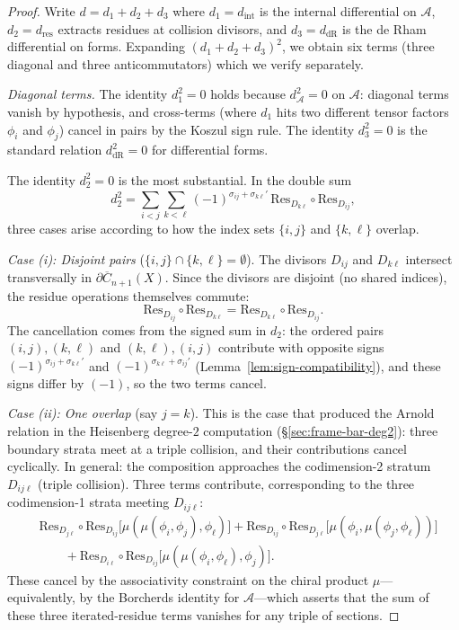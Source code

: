 \begin{proof}
Write $d = d_1 + d_2 + d_3$ where $d_1 = d_{\text{int}}$ is the internal differential on $\mathcal{A}$, $d_2 = d_{\text{res}}$ extracts residues at collision divisors, and $d_3 = d_{\text{dR}}$ is the de Rham differential on forms. Expanding $(d_1 + d_2 + d_3)^2$, we obtain six terms (three diagonal and three anticommutators) which we verify separately.

\emph{Diagonal terms.} The identity $d_1^2 = 0$ holds because $d_\mathcal{A}^2 = 0$ on $\mathcal{A}$: diagonal terms vanish by hypothesis, and cross-terms (where $d_1$ hits two different tensor factors $\phi_i$ and $\phi_j$) cancel in pairs by the Koszul sign rule. The identity $d_3^2 = 0$ is the standard relation $d_{\text{dR}}^2 = 0$ for differential forms.

The identity $d_2^2 = 0$ is the most substantial. In the double sum
\[d_2^2 = \sum_{i<j}\sum_{k<\ell} (-1)^{\sigma_{ij} + \sigma_{k\ell}'}\, \text{Res}_{D_{k\ell}} \circ \text{Res}_{D_{ij}},\]
three cases arise according to how the index sets $\{i,j\}$ and $\{k,\ell\}$ overlap.

\emph{Case (i): Disjoint pairs} ($\{i,j\} \cap \{k,\ell\} = \emptyset$). The divisors $D_{ij}$ and $D_{k\ell}$ intersect transversally in $\partial\overline{C}_{n+1}(X)$. Since the divisors are disjoint (no shared indices), the residue operations themselves commute:
\[\text{Res}_{D_{ij}} \circ \text{Res}_{D_{k\ell}} = \text{Res}_{D_{k\ell}} \circ \text{Res}_{D_{ij}}.\]
The cancellation comes from the signed sum in $d_2$: the ordered pairs $(i,j),(k,\ell)$ and $(k,\ell),(i,j)$ contribute with opposite signs $(-1)^{\sigma_{ij}+\sigma_{k\ell}'}$ and $(-1)^{\sigma_{k\ell}+\sigma_{ij}'}$ (Lemma~\ref{lem:sign-compatibility}), and these signs differ by $(-1)$, so the two terms cancel.

\emph{Case (ii): One overlap} (say $j = k$).  This is the case that produced the Arnold relation in the Heisenberg degree-$2$ computation (\S\ref{sec:frame-bar-deg2}): three boundary strata meet at a triple collision, and their contributions cancel cyclically.  In general: the composition approaches the codimension-2 stratum $D_{ij\ell}$ (triple collision). Three terms contribute, corresponding to the three codimension-1 strata meeting $D_{ij\ell}$:
\begin{align*}
&\text{Res}_{D_{j\ell}} \circ \text{Res}_{D_{ij}}\bigl[\mu(\mu(\phi_i, \phi_j), \phi_\ell)\bigr] + \text{Res}_{D_{ij}} \circ \text{Res}_{D_{j\ell}}\bigl[\mu(\phi_i, \mu(\phi_j, \phi_\ell))\bigr] \\
&\qquad + \text{Res}_{D_{i\ell}} \circ \text{Res}_{D_{ij}}\bigl[\mu(\mu(\phi_i, \phi_\ell), \phi_j)\bigr].
\end{align*}
These cancel by the associativity constraint on the chiral product $\mu$---equivalently, by the Borcherds identity for $\mathcal{A}$---which asserts that the sum of these three iterated-residue terms vanishes for any triple of sections.


\end{proof}
